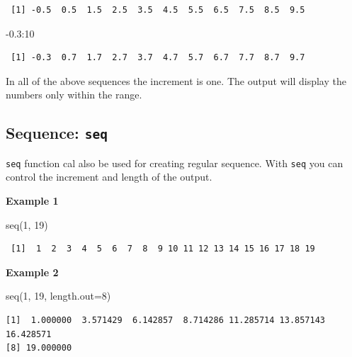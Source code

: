 \documentclass[
  letterpaper,
  DIV=11,
  numbers=noendperiod]{scrreprt}
\newenvironment{Shaded}{\begin{snugshade}}{\end{snugshade}}
\newcommand{\AttributeTok}[1]{\textcolor[rgb]{0.40,0.45,0.13}{#1}}
\newcommand{\DecValTok}[1]{\textcolor[rgb]{0.68,0.00,0.00}{#1}}
\newcommand{\FloatTok}[1]{\textcolor[rgb]{0.68,0.00,0.00}{#1}}
\newcommand{\FunctionTok}[1]{\textcolor[rgb]{0.28,0.35,0.67}{#1}}
\newcommand{\NormalTok}[1]{\textcolor[rgb]{0.00,0.23,0.31}{#1}}
\newcommand{\SpecialCharTok}[1]{\textcolor[rgb]{0.37,0.37,0.37}{#1}}
\begin{document}
\begin{verbatim}
 [1] -0.5  0.5  1.5  2.5  3.5  4.5  5.5  6.5  7.5  8.5  9.5
\end{verbatim}

\begin{Shaded}
\begin{Highlighting}[]
\SpecialCharTok{{-}}\FloatTok{0.3}\SpecialCharTok{:}\DecValTok{10}
\end{Highlighting}
\end{Shaded}

\begin{verbatim}
 [1] -0.3  0.7  1.7  2.7  3.7  4.7  5.7  6.7  7.7  8.7  9.7
\end{verbatim}

In all of the above sequences the increment is one. The output will
display the numbers only within the range.

\hypertarget{sequence-seq}{%
\subsection{\texorpdfstring{Sequence:
\texttt{seq}}{Sequence: seq}}\label{sequence-seq}}

\texttt{seq} function cal also be used for creating regular sequence.
With \texttt{seq} you can control the increment and length of the
output.

\textbf{Example 1}

\begin{Shaded}
\begin{Highlighting}[]
\FunctionTok{seq}\NormalTok{(}\DecValTok{1}\NormalTok{, }\DecValTok{19}\NormalTok{)}
\end{Highlighting}
\end{Shaded}

\begin{verbatim}
 [1]  1  2  3  4  5  6  7  8  9 10 11 12 13 14 15 16 17 18 19
\end{verbatim}

\textbf{Example 2}

\begin{Shaded}
\begin{Highlighting}[]
\FunctionTok{seq}\NormalTok{(}\DecValTok{1}\NormalTok{, }\DecValTok{19}\NormalTok{, }\AttributeTok{length.out=}\DecValTok{8}\NormalTok{)}
\end{Highlighting}
\end{Shaded}

\begin{verbatim}
[1]  1.000000  3.571429  6.142857  8.714286 11.285714 13.857143 16.428571
[8] 19.000000
\end{verbatim}
\end{document}
